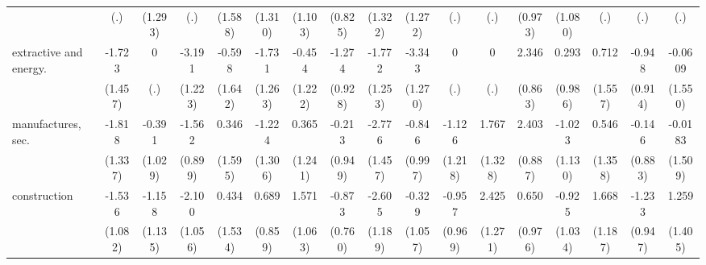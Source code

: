 {\begin{tabular}{l*{16}{c}}
                    &         (.)         &     (1.293)         &         (.)         &     (1.588)         &     (1.310)         &     (1.103)         &     (0.825)         &     (1.322)         &     (1.272)         &         (.)         &         (.)         &     (0.973)         &     (1.080)         &         (.)         &         (.)         &         (.)         \\
[1em]
extractive and energy.&      -1.723         &           0         &      -3.191\sym{**} &      -0.598         &      -1.731         &      -0.454         &      -1.274         &      -1.772         &      -3.343\sym{**} &           0         &           0         &       2.346\sym{**} &       0.293         &       0.712         &      -0.948         &     -0.0609         \\
                    &     (1.457)         &         (.)         &     (1.223)         &     (1.642)         &     (1.263)         &     (1.222)         &     (0.928)         &     (1.253)         &     (1.270)         &         (.)         &         (.)         &     (0.863)         &     (0.986)         &     (1.557)         &     (0.914)         &     (1.550)         \\
[1em]
manufactures, sec.  &      -1.818         &      -0.391         &      -1.562         &       0.346         &      -1.224         &       0.365         &      -0.213         &      -2.776         &      -0.846         &      -1.126         &       1.767         &       2.403\sym{**} &      -1.023         &       0.546         &      -0.146         &     -0.0183         \\
                    &     (1.337)         &     (1.029)         &     (0.899)         &     (1.595)         &     (1.306)         &     (1.241)         &     (0.949)         &     (1.457)         &     (0.997)         &     (1.218)         &     (1.328)         &     (0.887)         &     (1.130)         &     (1.358)         &     (0.883)         &     (1.509)         \\
[1em]
construction        &      -1.536         &      -1.158         &      -2.100\sym{*}  &       0.434         &       0.689         &       1.571         &      -0.873         &      -2.605\sym{*}  &      -0.329         &      -0.957         &       2.425         &       0.650         &      -0.925         &       1.668         &      -1.233         &       1.259         \\
                    &     (1.082)         &     (1.135)         &     (1.056)         &     (1.534)         &     (0.859)         &     (1.063)         &     (0.760)         &     (1.189)         &     (1.057)         &     (0.969)         &     (1.271)         &     (0.976)         &     (1.034)         &     (1.187)         &     (0.947)         &     (1.405)         \\

\end{tabular}}
